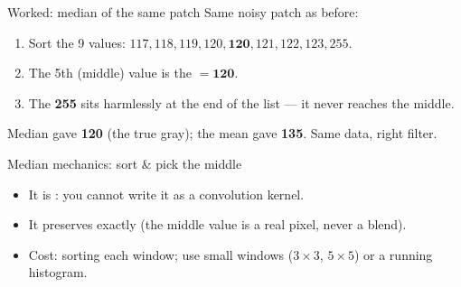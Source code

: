 \documentclass[10pt,aspectratio=169]{beamer}
\begin{document}
\begin{frame}{Worked: median of the same patch}
  Same noisy patch as before:
  \begin{center}\end{center}
  \begin{enumerate}
    \item Sort the 9 values: $117,118,119,120,\mathbf{120},121,122,123,255$.
    \item The 5th (middle) value is the  $=\mathbf{120}$.
    \item The \textbf{255} sits harmlessly at the end of the list — it never reaches the middle.
  \end{enumerate}
  \begin{goodbox}
    Median gave \textbf{120} (the true gray); the mean gave \textbf{135}. Same data, right filter.
  \end{goodbox}
\end{frame}

\begin{frame}{Median mechanics: sort \& pick the middle}
  \begin{center}
  \end{center}
  \begin{itemize}
    \item It is : you cannot write it as a convolution kernel.
    \item It preserves  exactly (the middle value is a real pixel, never a blend).
    \item Cost: sorting each window; use small windows ($3\times3$, $5\times5$) or a running histogram.
  \end{itemize}
\end{frame}
\end{document}

